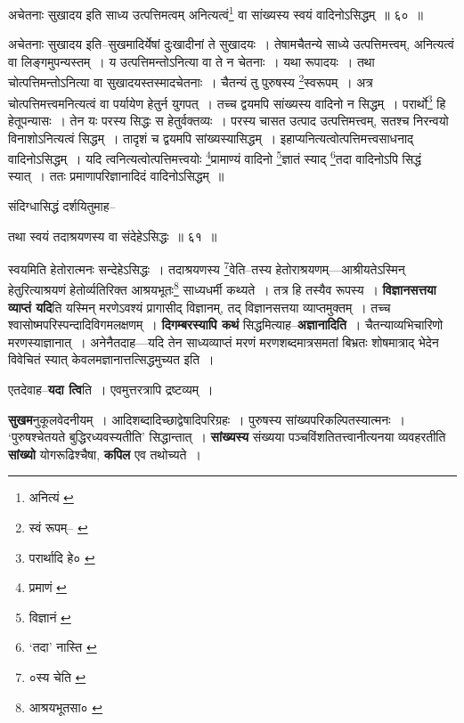 \documentclass[article,12pt,a4paper]{memoir}
\begin{document}
	अचेतनाः सुखादय इति साध्य उत्पत्तिमत्वम् अनित्यत्वं\footnote{अनित्यं \cite{dp-msB} \cite{dp-edP} \cite{dp-edH} \cite{dp-edE} \cite{dp-edN}} वा सांख्यस्य स्वयं वादिनोऽसिद्धम् ॥ ६० ॥ 
	  
	अचेतनाः सुखादय इति--सुखमादिर्येषां दुःखादीनां ते सुखादयः । तेषामचैतन्ये साध्ये उत्पत्तिमत्त्वम्, अनित्यत्वं वा लिङ्गमुपन्यस्तम् । य उत्पत्तिमन्तोऽनित्या वा ते न चेतनाः । यथा रूपादयः । तथा चोत्पत्तिमन्तोऽनित्या वा सुखादयस्तस्मादचेतनाः । चैतन्यं तु पुरुषस्य \footnote{स्वं रूपम्--\cite{dp-msA} \cite{dp-msB} \cite{dp-edP} \cite{dp-edH} \cite{dp-edN}}स्वरूपम् । अत्र चोत्पत्तिमत्त्वमनित्यत्वं वा पर्यायेण हेतुर्न युगपत् । तच्च द्वयमपि सांख्यस्य वादिनो न सिद्धम् । परार्थो\footnote{परार्थादि हे० \cite{dp-msB}} हि हेतूपन्यासः । तेन यः परस्य सिद्धः स हेतुर्वक्तव्यः । परस्य चासत उत्पाद उत्पत्तिमत्त्वम्, सतश्च निरन्वयो विनाशोऽनित्यत्वं सिद्धम् । तादृशं च द्वयमपि सांख्यस्यासिद्धम् । इहाप्यनित्यत्वोत्पत्तिमत्त्वसाधनाद् वादिनोऽसिद्धम् । यदि त्वनित्यत्वोत्पत्तिमत्त्वयोः \footnote{प्रमाणं \cite{dp-msA} \cite{dp-msC} \cite{dp-edP} \cite{dp-edH} \cite{dp-edE} \cite{dp-edN}}प्रामाण्यं वादिनो \footnote{विज्ञानं \cite{dp-msC}}ज्ञातं स्याद् \footnote{‘तदा’ नास्ति \cite{dp-msA} \cite{dp-edP} \cite{dp-edH} \cite{dp-edE} \cite{dp-edN}}तदा वादिनोऽपि सिद्धं स्यात् । ततः प्रमाणापरिज्ञानादिदं वादिनोऽसिद्धम् ॥ 
	  
	संदिग्धासिद्धं दर्शयितुमाह-- 
	  
	तथा स्वयं तदाश्रयणस्य वा संदेहेऽसिद्धः ॥ ६१ ॥ 
	  
	स्वयमिति हेतोरात्मनः सन्देहेऽसिद्धः । तदाश्रयणस्य \footnote{०स्य चेति \cite{dp-msA} \cite{dp-msB} \cite{dp-msC} \cite{dp-msD} \cite{dp-edP} \cite{dp-edH} \cite{dp-edE}}वेति--तस्य हेतोराश्रयणम्—आश्रीयतेऽस्मिन् हेतुरित्याश्रयणं हेतोर्व्यतिरिक्त आश्रयभूतः\footnote{आश्रयभूतसा० \cite{dp-edE}} साध्यधर्मी कथ्यते । तत्र हि तस्यैव रूपस्य । \textbf{विज्ञानसत्तया व्याप्तं यदि}ति यस्मिन् मरणेऽवश्यं प्रागासीद् विज्ञानम्, तद् विज्ञानसत्तया व्याप्तमुक्तम् । तच्च श्वासोष्मपरिस्पन्दादिविगमलक्षणम् । \textbf{दिगम्बरस्यापि कथं} सिद्धमित्याह--\textbf{अज्ञानादिति} । चैतन्याव्यभिचारिणो मरणस्याज्ञानात् । अनेनैतदाह—यदि तेन साध्यव्याप्तं मरणं मरणशब्दमात्रसमतां बिभ्रतः शोषमात्राद् भेदेन विवेचितं स्यात् केवलमज्ञानात्तत्सिद्धमुच्यत इति ।
	\pend
      

	  \pstart एतदेवाह--\textbf{यदा त्वि}ति । एवमुत्तरत्रापि द्रष्टव्यम् ।
	\pend
      

	  \pstart \textbf{सुखम}नुकूलवेदनीयम् । आदिशब्दादिच्छाद्वेषादिपरिग्रहः । पुरुषस्य सांख्यपरिकल्पितस्यात्मनः । ‘पुरुषश्चेतयते बुद्धिरध्यवस्यतीति’ सिद्धान्तात् । \textbf{सांख्यस्य} संख्यया पञ्चविंशतितत्त्वानीत्यनया व्यवहरतीति \textbf{सांख्यो} योगरूढिश्चैषा, \textbf{कपिल} एव तथोच्यते ।
	\pend
      
\end{document}
